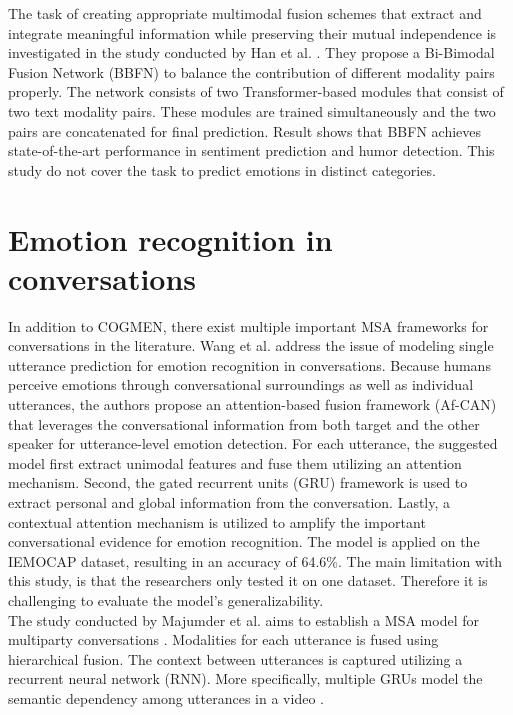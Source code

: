 The task of creating appropriate multimodal fusion schemes that extract and integrate meaningful information while preserving their mutual independence is investigated in the study conducted by Han et al. \cite{bimodal-fusion1-10.1145/3462244.3479919}. They propose a Bi-Bimodal Fusion Network (BBFN) to balance the contribution of different modality pairs properly. The network consists of two Transformer-based modules that consist of two text modality pairs. These modules are trained simultaneously and the two pairs are concatenated for final prediction. Result shows that BBFN achieves state-of-the-art performance in sentiment prediction and humor detection. This study do not cover the task to predict emotions in distinct categories.  

\section{Emotion recognition in conversations}
In addition to COGMEN, there exist multiple important MSA frameworks for conversations in the literature. Wang et al. \cite{Af-CAN_2021} address the issue of modeling single utterance prediction for emotion recognition in conversations. Because humans perceive emotions through conversational surroundings as well as individual utterances, the authors propose an attention-based fusion framework (Af-CAN) that leverages the conversational information from both target and the other speaker for utterance-level emotion detection. For each utterance, the suggested model first extract unimodal features and fuse them utilizing an attention mechanism. Second, the gated recurrent units (GRU) framework is used to extract personal and global information from the conversation. Lastly, a contextual attention mechanism is utilized to amplify the important conversational evidence for emotion recognition. The model is applied on the IEMOCAP dataset, resulting in an accuracy of 64.6\%. The main limitation with this study, is that the researchers only tested it on one dataset. Therefore it is challenging to evaluate the model's generalizability. \\

The study conducted by Majumder et al. \cite{DialogueRNN_MAJUMDER2018124} aims to establish a MSA model for multiparty conversations \cite{Af-CAN_2021}. Modalities for each utterance is fused using hierarchical fusion. The context between utterances is captured utilizing a recurrent neural network (RNN). More specifically, multiple GRUs model the semantic dependency among utterances in a video \cite{DialogueRNN_MAJUMDER2018124}. \\

